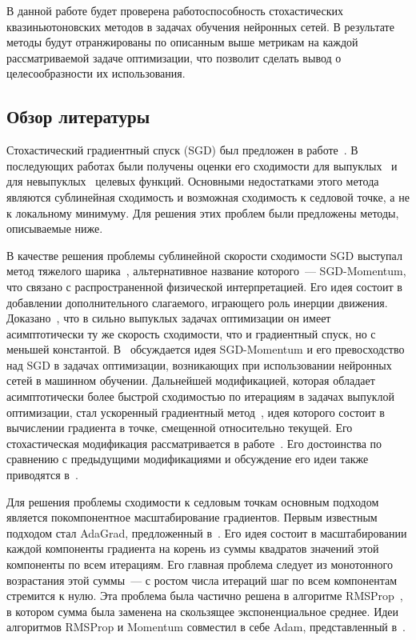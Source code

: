 \documentclass[preprint,12pt]{elsarticle}
\begin{document}
{В данной работе будет проверена работоспособность стохастических квазиньютоновских методов в задачах обучения нейронных сетей. В результате методы будут отранжированы по описанным выше метрикам на каждой рассматриваемой задаче оптимизации, что позволит сделать вывод о целесообразности их использования.

\subsection{Обзор литературы}
\label{SS:0.1}
Стохастический градиентный спуск (SGD) был предложен в работе~\cite{SGDorig}.
В последующих работах были получены оценки его сходимости для выпуклых~\cite{SGDconvergence} и для невыпуклых~\cite{SGDconvergenceNonconvex} целевых функций.
Основными недостатками этого метода являются сублинейная сходимость и возможная сходимость к седловой точке, а не к локальному минимуму. Для решения этих проблем были предложены методы, описываемые ниже.

В качестве решения проблемы сублинейной скорости сходимости SGD выступал метод тяжелого шарика~\cite{Polyak}, альтернативное название которого~--- SGD-Momentum, что связано с распространенной физической интерпретацией.
Его идея состоит в добавлении дополнительного слагаемого, играющего роль инерции движения.
Доказано~\cite{HBconvergence}, что в сильно выпуклых задачах оптимизации он имеет асимптотически ту же скорость сходимости, что и градиентный спуск, но с меньшей константой.
В~\cite{GDoverview} обсуждается идея SGD-Momentum и его превосходство над SGD в задачах оптимизации, возникающих при использовании нейронных сетей в машинном обучении. 
Дальнейшей модификацией, которая обладает асимптотически более быстрой сходимостью по итерациям в задачах выпуклой оптимизации, стал ускоренный градиентный метод~\cite{NAG}, идея которого состоит в вычислении градиента в точке, смещенной относительно текущей. 
Его стохастическая модификация рассматривается в работе~\cite{NAGstochastic}.
Его достоинства по сравнению с предыдущими модификациями и обсуждение его идеи также приводятся в~\cite{GDoverview}.

Для решения проблемы сходимости к седловым точкам основным подходом является покомпонентное масштабирование градиентов. 
Первым известным подходом стал AdaGrad, предложенный в~\cite{AdaGrad}. 
Его идея состоит в масштабировании каждой компоненты градиента на корень из суммы квадратов значений этой компоненты по всем итерациям. 
Его главная проблема следует из монотонного возрастания этой суммы~--- с ростом числа итераций шаг по всем компонентам стремится к нулю. 
Эта проблема была частично решена в алгоритме RMSProp~\cite{RMSprop}, в котором сумма была заменена на скользящее экспоненциальное среднее. 
Идеи алгоритмов RMSProp и Momentum совместил в себе Adam, представленный в~\cite{adam}.

}
\end{document}
